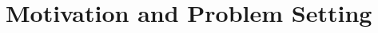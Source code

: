 \documentclass[notheorems, aspectratio=169, presentation]{beamer}
\begin{document}

\section{Motivation and Problem Setting}


\end{document}
